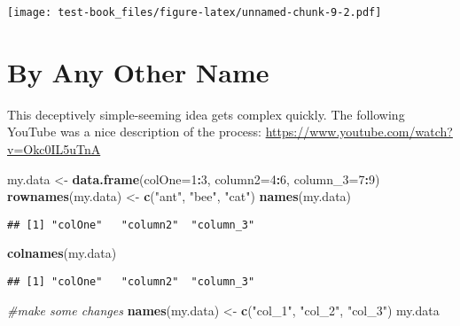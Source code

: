 \documentclass[]{book}
\newenvironment{Shaded}{\begin{snugshade}}{\end{snugshade}}
\newcommand{\CommentTok}[1]{\textcolor[rgb]{0.56,0.35,0.01}{\textit{#1}}}
\newcommand{\DataTypeTok}[1]{\textcolor[rgb]{0.13,0.29,0.53}{#1}}
\newcommand{\DecValTok}[1]{\textcolor[rgb]{0.00,0.00,0.81}{#1}}
\newcommand{\KeywordTok}[1]{\textcolor[rgb]{0.13,0.29,0.53}{\textbf{#1}}}
\newcommand{\NormalTok}[1]{#1}
\newcommand{\OperatorTok}[1]{\textcolor[rgb]{0.81,0.36,0.00}{\textbf{#1}}}
\newcommand{\StringTok}[1]{\textcolor[rgb]{0.31,0.60,0.02}{#1}}
\begin{document}
\texttt{[image: test-book\_files/figure-latex/unnamed-chunk-9-2.pdf]}

\hypertarget{by-any-other-name}{%
\chapter{By Any Other Name}\label{by-any-other-name}}

This deceptively simple-seeming idea gets complex quickly. The following YouTube was a nice description of the process: \url{https://www.youtube.com/watch?v=Okc0IL5uTnA}

\begin{Shaded}
\begin{Highlighting}[]
\NormalTok{my.data <-}\StringTok{ }\KeywordTok{data.frame}\NormalTok{(}\DataTypeTok{colOne=}\DecValTok{1}\OperatorTok{:}\DecValTok{3}\NormalTok{, }\DataTypeTok{column2=}\DecValTok{4}\OperatorTok{:}\DecValTok{6}\NormalTok{, }\DataTypeTok{column_3=}\DecValTok{7}\OperatorTok{:}\DecValTok{9}\NormalTok{)}
\KeywordTok{rownames}\NormalTok{(my.data) <-}\StringTok{ }\KeywordTok{c}\NormalTok{(}\StringTok{"ant"}\NormalTok{, }\StringTok{"bee"}\NormalTok{, }\StringTok{"cat"}\NormalTok{)}
\KeywordTok{names}\NormalTok{(my.data)}
\end{Highlighting}
\end{Shaded}

\begin{verbatim}
## [1] "colOne"   "column2"  "column_3"
\end{verbatim}

\begin{Shaded}
\begin{Highlighting}[]
\KeywordTok{colnames}\NormalTok{(my.data)}
\end{Highlighting}
\end{Shaded}

\begin{verbatim}
## [1] "colOne"   "column2"  "column_3"
\end{verbatim}

\begin{Shaded}
\begin{Highlighting}[]
\CommentTok{#make some changes}
\KeywordTok{names}\NormalTok{(my.data) <-}\StringTok{ }\KeywordTok{c}\NormalTok{(}\StringTok{"col_1"}\NormalTok{, }\StringTok{"col_2"}\NormalTok{, }\StringTok{"col_3"}\NormalTok{)}
\NormalTok{my.data}
\end{Highlighting}
\end{Shaded}
\end{document}
